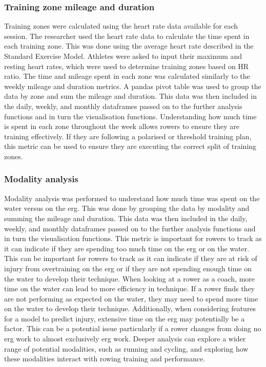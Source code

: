\subsubsection{Training zone mileage and duration}
Training zones were calculated using the heart rate data available for each session. The researcher used the heart rate data to calculate the time spent in each training zone. This was done using the average heart rate described in the Standard Exercise Model. Athletes were asked to input their maximum and resting heart rates, which were used to determine training zones based on HR ratio. The time and mileage spent in each zone was calculated similarly to the weekly mileage and duration metrics. A pandas pivot table was used to group the data by zone and sum the mileage and duration. This data was then included in the daily, weekly, and monthly dataframes passed on to the further analysis functions and in turn the visualisation functions. Understanding how much time is spent in each zone throughout the week allows rowers to ensure they are training effectively. If they are following a polarised or threshold training plan, this metric can be used to ensure they are executing the correct split of training zones.
\subsubsection{Modality analysis}
Modality analysis was performed to understand how much time was spent on the water versus on the erg. This was done by grouping the data by modality and summing the mileage and duration. This data was then included in the daily, weekly, and monthly dataframes passed on to the further analysis functions and in turn the visualisation functions. This metric is important for rowers to track as it can indicate if they are spending too much time on the erg or on the water. This can be important for rowers to track as it can indicate if they are at risk of injury from overtraining on the erg or if they are not spending enough time on the water to develop their technique. When looking at a rower as a coach, more time on the water can lead to more efficiency in technique. If a rower finds they are not performing as expected on the water, they may need to spend more time on the water to develop their technique. Additionally, when considering features for a model to predict injury, extensive time on the erg may potentially be a factor. This can be a potential issue particularly if a rower changes from doing no erg work to almost exclusively erg work. Deeper analysis can explore a wider range of potential modalities, such as running and cycling, and exploring how these modalities interact with rowing training and performance.
